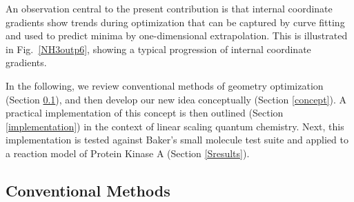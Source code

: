 \documentclass[prl,aps,preprint,showpacs,superbib]{revtex4}
\begin{document}

An observation central to the present contribution is that internal coordinate gradients show trends 
during optimization that can be captured by curve fitting and used to predict minima by 
one-dimensional extrapolation.  This is illustrated in Fig.~\ref{NH3outp6}, showing a typical progression of 
internal coordinate gradients.  

In the following, we review conventional methods of geometry optimization (Section \ref{conventional}), 
and then  develop our new idea conceptually (Section \ref{concept}).  A practical implementation of this 
concept is then outlined (Section \ref{implementation}) in the context of linear scaling quantum 
chemistry.  Next, this implementation is tested against Baker's small molecule test suite and applied to 
a reaction model of Protein Kinase A (Section \ref{Sresults}).  

\subsection{Conventional Methods}\label{conventional}
\end{document}
